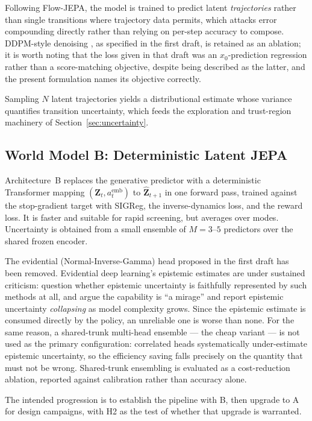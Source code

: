 \documentclass[12pt, a4paper]{article}
\begin{document}
Following Flow-JEPA, the model is trained to predict latent \textit{trajectories} rather than single transitions where trajectory data permits, which attacks error compounding directly rather than relying on per-step accuracy to compose. DDPM-style denoising \citep{ho2020ddpm}, as specified in the first draft, is retained as an ablation; it is worth noting that the loss given in that draft was an $x_0$-prediction regression rather than a score-matching objective, despite being described as the latter, and the present formulation names its objective correctly.

Sampling $N$ latent trajectories yields a distributional estimate whose variance quantifies transition uncertainty, which feeds the exploration and trust-region machinery of Section~\ref{sec:uncertainty}.

\subsection{World Model B: Deterministic Latent JEPA}
\label{sec:archB}

Architecture~B replaces the generative predictor with a deterministic Transformer mapping $(\mathbf{Z}_t, a_t^{\text{emb}})$ to $\hat{\mathbf{Z}}_{t+1}$ in one forward pass, trained against the stop-gradient target with SIGReg, the inverse-dynamics loss, and the reward loss. It is faster and suitable for rapid screening, but averages over modes. Uncertainty is obtained from a small ensemble of $M = 3$--$5$ predictors over the shared frozen encoder.

The evidential (Normal-Inverse-Gamma) head proposed in the first draft has been removed. Evidential deep learning's epistemic estimates are under sustained criticism: \citet{jurgens2024edl} question whether epistemic uncertainty is faithfully represented by such methods at all, and \citet{shen2024mirage} argue the capability is ``a mirage'' and report epistemic uncertainty \textit{collapsing} as model complexity grows. Since the epistemic estimate is consumed directly by the policy, an unreliable one is worse than none. For the same reason, a shared-trunk multi-head ensemble --- the cheap variant --- is not used as the primary configuration: correlated heads systematically under-estimate epistemic uncertainty, so the efficiency saving falls precisely on the quantity that must not be wrong. Shared-trunk ensembling is evaluated as a cost-reduction ablation, reported against calibration rather than accuracy alone.

The intended progression is to establish the pipeline with B, then upgrade to A for design campaigns, with H2 as the test of whether that upgrade is warranted.
\end{document}
